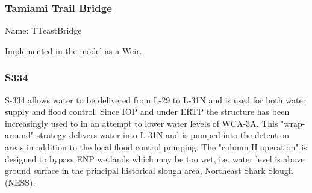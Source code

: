 %

\clearpage
\subsubsection{Tamiami Trail Bridge}
Name: TTeastBridge

Implemented in the model as a Weir.


\clearpage
\subsubsection{S334}
S-334 allows water to be delivered from L-29 to L-31N and is used for both water supply and flood control.
Since IOP and under ERTP the structure has been increasingly used to in an attempt to lower water levels of WCA-3A.
This "wrap-around" strategy delivers water into L-31N and is pumped into the detention areas in addition to the local flood control pumping.
The "column II operation" is designed to bypass ENP wetlands which may be too wet, i.e. water level is above ground surface in the principal historical slough area, Northeast Shark Slough (NESS).

